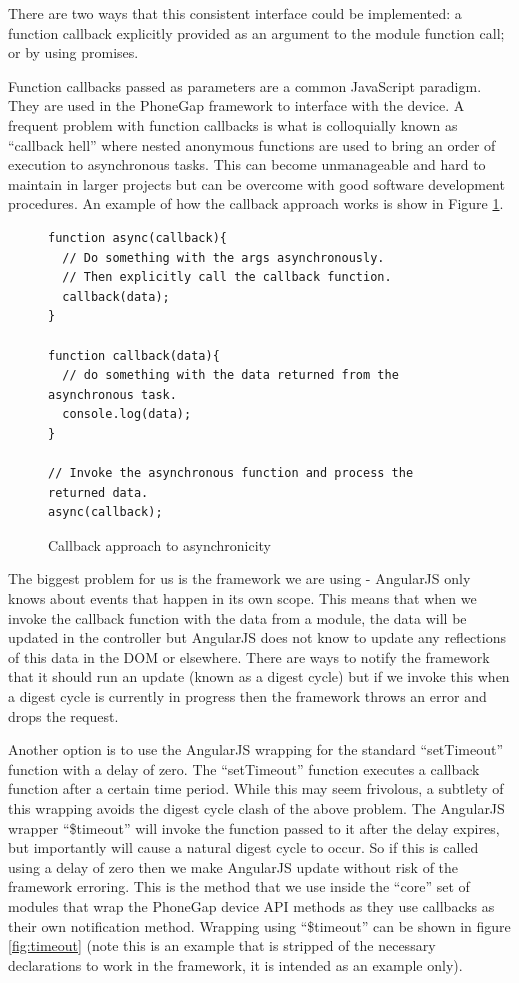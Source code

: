 There are two ways that this consistent interface could be
implemented: a function callback explicitly provided as an argument to
the module function call; or by using promises.

Function callbacks passed as parameters are a common JavaScript
paradigm. They are used in the PhoneGap framework to interface with
the device\cite{phonegap_currentpos}. A frequent problem with function
callbacks is what is colloquially known as ``callback hell''
\cite{callback_hell} where nested anonymous functions are used to
bring an order of execution to asynchronous tasks. This can become
unmanageable and hard to maintain in larger projects but can be
overcome with good software development procedures. An example of how
the callback approach works is show in Figure \ref{fig:callbacks}.

\begin{figure}[h]
\begin{verbatim}
function async(callback){
  // Do something with the args asynchronously.
  // Then explicitly call the callback function.
  callback(data);
}

function callback(data){
  // do something with the data returned from the asynchronous task.
  console.log(data);
}

// Invoke the asynchronous function and process the returned data.
async(callback);
\end{verbatim}
\caption{Callback approach to asynchronicity}
\label{fig:callbacks}
\end{figure}

The biggest problem for us is the framework we are using - AngularJS
only knows about events that happen in its own scope. This means that
when we invoke the callback function with the data from a module, the
data will be updated in the controller but AngularJS does not know to
update any reflections of this data in the DOM or elsewhere. There are
ways to notify the framework that it should run an update (known as a
digest cycle)\cite{angularjs_apply} but if we invoke this when a
digest cycle is currently in progress then the framework throws an
error and drops the request.

Another option is to use the AngularJS wrapping for the standard
``setTimeout'' function with a delay of zero. The ``setTimeout''
function executes a callback function after a certain time
period\cite{setTimeout}. While this may seem
frivolous, a subtlety of this wrapping avoids the digest cycle clash
of the above problem. The AngularJS wrapper ``\$timeout'' will invoke
the function passed to it after the delay expires, but importantly
will cause a natural digest cycle to occur. So if this is called using
a delay of zero then we make AngularJS update without risk of the
framework erroring. This is the method that we use inside the ``core''
set of modules that wrap the PhoneGap device API
methods\cite{wrappingPhonegap} as they use callbacks as their own
notification method. Wrapping using ``\$timeout'' can be shown in
figure \ref{fig:timeout} (note this is an example that is stripped of
the necessary declarations to work in the framework, it is intended as
an example only).

